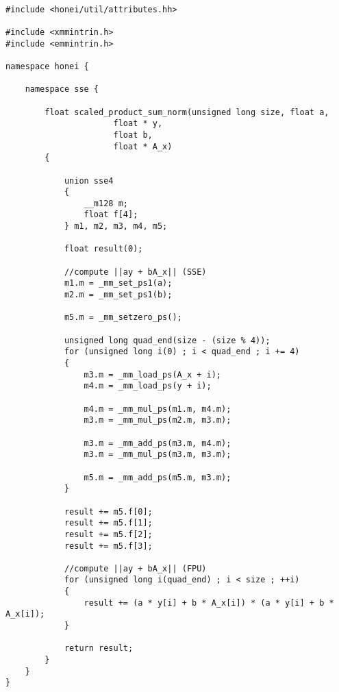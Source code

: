 \documentclass{article}
\begin{document}
\begin{lstlisting}[float, caption= Developing kernels - SSE Implementation, label=list_5]

#include <honei/util/attributes.hh>

#include <xmmintrin.h>
#include <emmintrin.h>

namespace honei {

    namespace sse {

        float scaled_product_sum_norm(unsigned long size, float a,
				      float * y,
				      float b,
				      float * A_x)
        {

            union sse4
            {
                __m128 m;
                float f[4];
            } m1, m2, m3, m4, m5;

            float result(0);

            //compute ||ay + bA_x|| (SSE)
            m1.m = _mm_set_ps1(a);
            m2.m = _mm_set_ps1(b);

            m5.m = _mm_setzero_ps();

            unsigned long quad_end(size - (size % 4));
            for (unsigned long i(0) ; i < quad_end ; i += 4)
            {
                m3.m = _mm_load_ps(A_x + i);
                m4.m = _mm_load_ps(y + i);

                m4.m = _mm_mul_ps(m1.m, m4.m);
                m3.m = _mm_mul_ps(m2.m, m3.m);

                m3.m = _mm_add_ps(m3.m, m4.m);
                m3.m = _mm_mul_ps(m3.m, m3.m);

                m5.m = _mm_add_ps(m5.m, m3.m);
            }

            result += m5.f[0];
            result += m5.f[1];
            result += m5.f[2];
            result += m5.f[3];

            //compute ||ay + bA_x|| (FPU)
            for (unsigned long i(quad_end) ; i < size ; ++i)
            {
                result += (a * y[i] + b * A_x[i]) * (a * y[i] + b * A_x[i]);
            }

            return result;
        }
    }
}
\end{lstlisting}

\FloatBarrier
\end{document}

